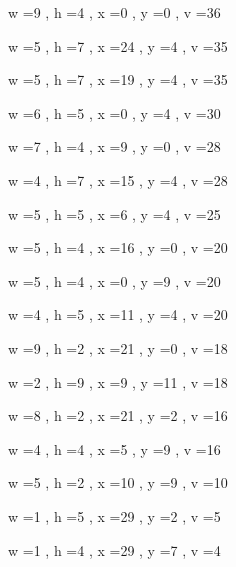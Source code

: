 \documentclass[11pt]{article}
\begin{document}
w =9 , h =4 , x =0 , y =0 , v =36
\par
w =5 , h =7 , x =24 , y =4 , v =35
\par
w =5 , h =7 , x =19 , y =4 , v =35
\par
w =6 , h =5 , x =0 , y =4 , v =30
\par
w =7 , h =4 , x =9 , y =0 , v =28
\par
w =4 , h =7 , x =15 , y =4 , v =28
\par
w =5 , h =5 , x =6 , y =4 , v =25
\par
w =5 , h =4 , x =16 , y =0 , v =20
\par
w =5 , h =4 , x =0 , y =9 , v =20
\par
w =4 , h =5 , x =11 , y =4 , v =20
\par
w =9 , h =2 , x =21 , y =0 , v =18
\par
w =2 , h =9 , x =9 , y =11 , v =18
\par
w =8 , h =2 , x =21 , y =2 , v =16
\par
w =4 , h =4 , x =5 , y =9 , v =16
\par
w =5 , h =2 , x =10 , y =9 , v =10
\par
w =1 , h =5 , x =29 , y =2 , v =5
\par
w =1 , h =4 , x =29 , y =7 , v =4
\par
\newpage
\end{document}
